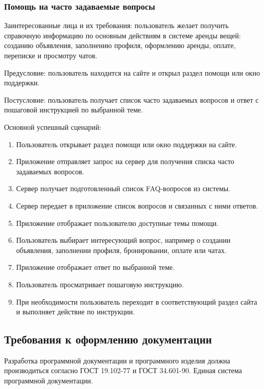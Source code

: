 \subsubsection{Помощь на часто задаваемые вопросы}

Заинтересованные лица и их требования: пользователь желает получить справочную информацию по основным действиям в системе аренды вещей: созданию объявления, заполнению профиля, оформлению аренды, оплате, переписке и просмотру чатов.

Предусловие: пользователь находится на сайте и открыл раздел помощи или окно поддержки.

Постусловие: пользователь получает список часто задаваемых вопросов и ответ с пошаговой инструкцией по выбранной теме.

Основной успешный сценарий:

\begin{enumerate}
    \item Пользователь открывает раздел помощи или окно поддержки на сайте.
    \item Приложение отправляет запрос на сервер для получения списка часто задаваемых вопросов.
    \item Сервер получает подготовленный список FAQ-вопросов из системы.
    \item Сервер передает в приложение список вопросов и связанных с ними ответов.
    \item Приложение отображает пользователю доступные темы помощи.
    \item Пользователь выбирает интересующий вопрос, например о создании объявления, заполнении профиля, бронировании, оплате или чатах.
    \item Приложение отображает ответ по выбранной теме.
    \item Пользователь просматривает пошаговую инструкцию.
    \item При необходимости пользователь переходит в соответствующий раздел сайта и выполняет действие по инструкции.
\end{enumerate}

\subsection{Требования к оформлению документации}

Разработка программной документации и программного изделия должна производиться согласно ГОСТ 19.102-77 и ГОСТ 34.601-90. Единая система программной документации.